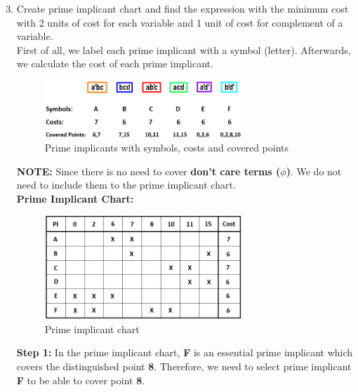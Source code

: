 \documentclass[pdftex,12pt,a4paper]{article}
\begin{document}
\begin{enumerate}[label=\alph*)]
  \setcounter{enumi}{2}
  \item Create prime implicant chart and find the expression with the minimum cost with 2 units of cost for each variable and 1 unit of cost for complement of a variable.\\
  
  First of all, we label each prime implicant with a symbol (letter). Afterwards, we calculate the cost of each prime implicant.

  \begin{figure}[H]
    \centering
        \includegraphics[width=0.7\textwidth]{implicantsymbol.png}	
        \caption{Prime implicants with symbols, costs and covered points}
        \label{fig1}
   \end{figure}

\textbf{NOTE:} Since there is no need to cover \textbf{don't care terms ($\phi$)}. We do not need to include them to the prime implicant chart.\\

\textbf{Prime Implicant Chart:}
    \begin{figure}[H]
    \centering
        \includegraphics[width=0.7\textwidth]{chart1.png}	
        \caption{Prime implicant chart}
        \label{fig1}
   \end{figure}

   \textbf{Step 1:} In the prime implicant chart, \textbf{F} is an essential prime implicant which covers the distinguished point \textbf{8}. Therefore, we need to select prime implicant \textbf{F} to be able to cover point \textbf{8}.\\
   

\end{enumerate}
\end{document}
